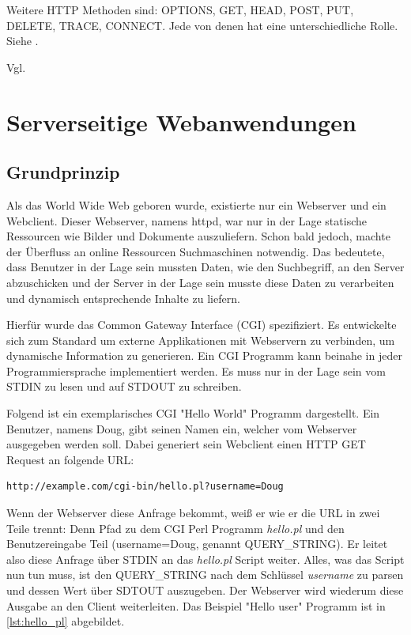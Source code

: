 Weitere HTTP Methoden sind: OPTIONS, GET, HEAD, POST, PUT, DELETE, TRACE, CONNECT. 
Jede von denen hat eine unterschiedliche Rolle. Siehe \citep[Kap. 4]{http_spec}. 

Vgl. \citep{dubost}

\section{Serverseitige Webanwendungen}

\subsection{Grundprinzip}

Als das World Wide Web geboren wurde, existierte nur ein Webserver und ein Webclient. Dieser Webserver, namens httpd, war nur in der Lage statische Ressourcen wie Bilder und Dokumente auszuliefern. Schon bald jedoch, machte der Überfluss an online Ressourcen Suchmaschinen notwendig. Das bedeutete, dass Benutzer in der Lage sein mussten Daten, wie den Suchbegriff, an den Server abzuschicken und der Server in der Lage sein musste diese Daten zu verarbeiten und dynamisch entsprechende Inhalte zu liefern.

Hierfür wurde das Common Gateway Interface (CGI) spezifiziert. Es entwickelte sich zum Standard um externe Applikationen mit Webservern zu verbinden, um dynamische Information zu generieren. Ein CGI Programm kann beinahe in jeder Programmiersprache implementiert werden. Es muss nur in der Lage sein vom STDIN zu lesen und auf STDOUT zu schreiben.  

Folgend ist ein exemplarisches CGI "Hello World" Programm dargestellt. Ein Benutzer, namens Doug, gibt seinen Namen ein, welcher vom Webserver ausgegeben werden soll. Dabei generiert sein Webclient einen HTTP GET Request an folgende URL: 

\begin{verbatim}
http://example.com/cgi-bin/hello.pl?username=Doug
\end{verbatim}

Wenn der Webserver diese Anfrage bekommt, weiß er wie er die URL in zwei Teile trennt: Denn Pfad zu dem CGI Perl Programm \emph{hello.pl} und den Benutzereingabe Teil (username=Doug, genannt QUERY\_STRING). Er leitet also diese Anfrage über STDIN an das \emph{hello.pl} Script weiter. Alles, was das Script nun tun muss, ist den QUERY\_STRING nach dem Schlüssel \emph{username} zu parsen und dessen Wert über SDTOUT auszugeben. Der Webserver wird wiederum diese Ausgabe an den Client weiterleiten. Das Beispiel "Hello user" Programm ist in \ref{lst:hello_pl} abgebildet. 

